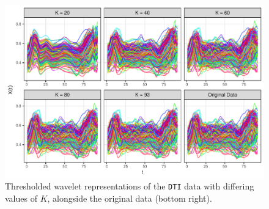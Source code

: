 \begin{steps}
  \begin{figure}[H]
      \centering
      \includegraphics[width=0.8\linewidth]{figures/DTI-recon.pdf}
      \caption{Thresholded wavelet representations of the \texttt{DTI} data with differing values of $K$, alongside the original data (bottom right).}
      \label{fig:DTI-recon}
  \end{figure}
\end{steps}
